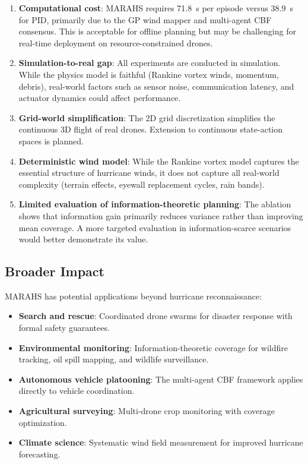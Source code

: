 \documentclass[11pt,twocolumn]{article}
\theoremstyle{definition}
\begin{document}
\begin{enumerate}[leftmargin=*]
    \item \textbf{Computational cost}: MARAHS requires 71.8~s per episode versus 38.9~s for PID, primarily due to the GP wind mapper and multi-agent CBF consensus. This is acceptable for offline planning but may be challenging for real-time deployment on resource-constrained drones.
    
    \item \textbf{Simulation-to-real gap}: All experiments are conducted in simulation. While the physics model is faithful (Rankine vortex winds, momentum, debris), real-world factors such as sensor noise, communication latency, and actuator dynamics could affect performance.
    
    \item \textbf{Grid-world simplification}: The 2D grid discretization simplifies the continuous 3D flight of real drones. Extension to continuous state-action spaces is planned.
    
    \item \textbf{Deterministic wind model}: While the Rankine vortex model captures the essential structure of hurricane winds, it does not capture all real-world complexity (terrain effects, eyewall replacement cycles, rain bands).
    
    \item \textbf{Limited evaluation of information-theoretic planning}: The ablation shows that information gain primarily reduces variance rather than improving mean coverage. A more targeted evaluation in information-scarce scenarios would better demonstrate its value.
\end{enumerate}

\subsection{Broader Impact}

MARAHS has potential applications beyond hurricane reconnaissance:

\begin{itemize}[leftmargin=*]
    \item \textbf{Search and rescue}: Coordinated drone swarms for disaster response with formal safety guarantees.
    \item \textbf{Environmental monitoring}: Information-theoretic coverage for wildfire tracking, oil spill mapping, and wildlife surveillance.
    \item \textbf{Autonomous vehicle platooning}: The multi-agent CBF framework applies directly to vehicle coordination.
    \item \textbf{Agricultural surveying}: Multi-drone crop monitoring with coverage optimization.
    \item \textbf{Climate science}: Systematic wind field measurement for improved hurricane forecasting.
\end{itemize}
\end{document}

